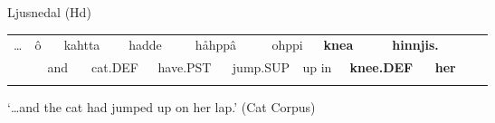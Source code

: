 \begin{listWWNumileveli}
\item 

\begin{styleExample}
Ljusnedal (Hd)

\end{styleExample}

\end{listWWNumileveli}

\begin{listWWNumlxxxiiileveli}
\item 

\end{listWWNumlxxxiiileveli}

\begin{tabular}{llllllllllllllllll}
\lsptoprule
… & \multicolumn{2}{l}{ô

} & \multicolumn{2}{l}{kahtta

} & \multicolumn{2}{l}{hadde

} & \multicolumn{2}{l}{håhppâ

} & \multicolumn{2}{l}{ohppi

} & \multicolumn{2}{l}{{\bfseries knea}

} & \multicolumn{2}{l}{{\bfseries hinnjis.}

} & \multicolumn{2}{l}{} & \\
\multicolumn{2}{l}{} & \multicolumn{2}{l}{and

} & \multicolumn{2}{l}{cat.DEF

} & \multicolumn{2}{l}{have.PST

} & \multicolumn{2}{l}{jump.SUP

} & \multicolumn{2}{l}{up in

} & \multicolumn{2}{l}{{\bfseries knee.DEF}

} & \multicolumn{2}{l}{{\bfseries her}

} & \multicolumn{2}{l}{}\\
\lspbottomrule
\end{tabular}

\begin{styleTranslation}
 ‘…and the cat had jumped up on her lap.’ (Cat Corpus)

\end{styleTranslation}

